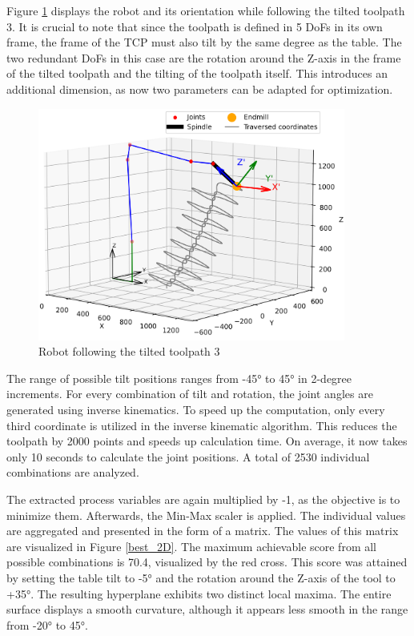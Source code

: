 Figure \ref{TP3_25_robot} displays the robot and its orientation while following the tilted toolpath 3. It is crucial to note that since the toolpath is defined in 5 \acrshort{DoF}s in its own frame, the frame of the \acrshort{TCP} must also tilt by the same degree as the table. The two redundant \acrshort{DoF}s in this case are the rotation around the Z-axis in the frame of the tilted toolpath and the tilting of the toolpath itself. This introduces an additional dimension, as now two parameters can be adapted for optimization.


\begin{figure}[H]
	\centerline{\includegraphics[width=0.9\textwidth]{figures/robotANDpath3_45.png}}
	\caption{Robot following the tilted toolpath 3}
	\label{TP3_25_robot}
\end{figure}

The range of possible tilt positions ranges from -45° to 45° in 2-degree increments. For every combination of tilt and rotation, the joint angles are generated using inverse kinematics. To speed up the computation, only every third coordinate is utilized in the inverse kinematic algorithm. This reduces the toolpath by 2000 points and speeds up calculation time. On average, it now takes only 10 seconds to calculate the joint positions. A total of 2530 individual combinations are analyzed.

The extracted process variables are again multiplied by -1, as the objective is to minimize them. Afterwards, the Min-Max scaler is applied. The individual values are aggregated and presented in the form of a matrix. The values of this matrix are visualized in Figure \ref{best_2D}. The maximum achievable score from all possible combinations is 70.4, visualized by the red cross. This score was attained by setting the table tilt to -5° and the rotation around the Z-axis of the tool to +35°. The resulting hyperplane exhibits two distinct local maxima. The entire surface displays a smooth curvature, although it appears less smooth in the range from -20° to 45°.
\newpage


